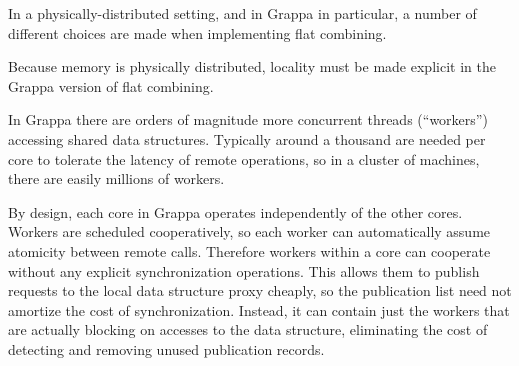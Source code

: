 In a physically-distributed setting, and in Grappa in particular, a number of different choices are made when implementing flat combining. 

Because memory is physically distributed, locality must be made explicit in the Grappa version of flat combining.

In Grappa there are orders of magnitude more concurrent threads (``workers'') accessing shared data structures. Typically around a thousand are needed per core to tolerate the latency of remote operations, so in a cluster of machines, there are easily millions of workers.

By design, each core in Grappa operates independently of the other cores. Workers are scheduled cooperatively, so each worker can automatically assume atomicity between remote calls. Therefore workers within a core can cooperate without any explicit synchronization operations. This allows them to publish requests to the local data structure proxy cheaply, so the publication list need not amortize the cost of synchronization. Instead, it can contain just the workers that are actually blocking on accesses to the data structure, eliminating the cost of detecting and removing unused publication records.

